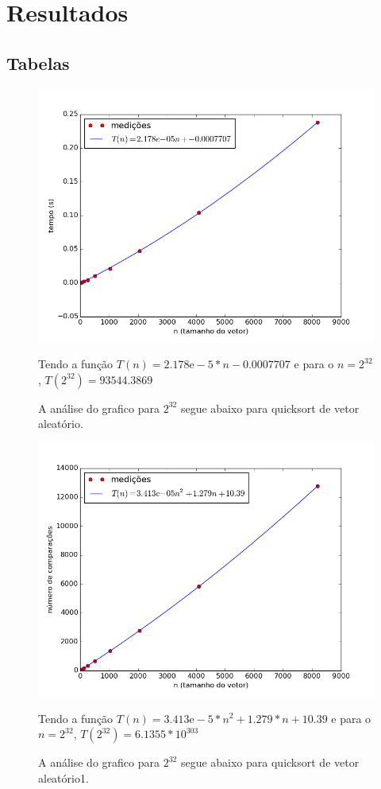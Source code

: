 \documentclass[12pt,a4paper,twoside]{report}
\begin{document}
\chapter{Resultados}
\section{Tabelas}



\begin{figure}[ht]
\centering \includegraphics[scale=0.8]{../quicksort/imagens/quicksortAleatorio0.png}
\caption{A análise do grafico para $2^{32}$ segue abaixo para quicksort de vetor aleatório.}
Tendo a função $T(n) = 2.178\mathrm{e}-5*n-0.0007707$ e para o $n =2^{32}$, $T(2^{32}) = 93544.3869$ 
\label{fig:quicksortAleatorio0}
\end{figure}


\begin{figure}[ht]
\centering \includegraphics[scale=0.8]{../quicksort/imagens/quicksortAleatorio1.png}
\caption{A análise do grafico para $2^{32}$ segue abaixo para quicksort de vetor aleatório1.}
Tendo a função $T(n) = 3.413\mathrm{e}-5*n^2+1.279*n+10.39$ e para o $n =2^{32}$, $T(2^{32}) = 6.1355* 10^{303}$ 
\label{fig:quicksortAleatorio1}
\end{figure}
\end{document}
